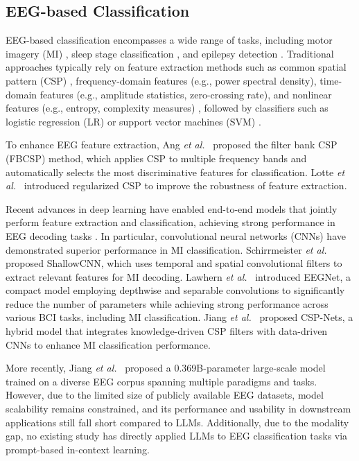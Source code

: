\documentclass[journal,twocolumn]{IEEEtran}
\begin{document}
\subsection{EEG-based Classification}
EEG-based classification encompasses a wide range of tasks, including motor imagery (MI) \cite{decety1996neurophysiological, liu2025spatial}, sleep stage classification \cite{aboalayon2016sleep}, and epilepsy detection \cite{acharya2013automated}. Traditional approaches typically rely on feature extraction methods such as common spatial pattern (CSP) \cite{Ramoser2000}, frequency-domain features (e.g., power spectral density), time-domain features (e.g., amplitude statistics, zero-crossing rate), and nonlinear features (e.g., entropy, complexity measures) \cite{hassan2017automated}, followed by classifiers such as logistic regression (LR) \cite{cox1958regression} or support vector machines (SVM) \cite{cortes1995support}.

To enhance EEG feature extraction, Ang \textit{et al.}~\cite{4634130} proposed the filter bank CSP (FBCSP) method, which applies CSP to multiple frequency bands and automatically selects the most discriminative features for classification. Lotte \textit{et al.}~\cite{lotte2010regularizing} introduced regularized CSP to improve the robustness of feature extraction.

Recent advances in deep learning have enabled end-to-end models that jointly perform feature extraction and classification, achieving strong performance in EEG decoding tasks \cite{craik2019deep, shoeibi2021epileptic}. In particular, convolutional neural networks (CNNs) have demonstrated superior performance in MI classification. Schirrmeister \textit{et al.}~\cite{schirrmeister2017deep} proposed ShallowCNN, which uses temporal and spatial convolutional filters to extract relevant features for MI decoding. Lawhern \textit{et al.}~\cite{EEGNet} introduced EEGNet, a compact model employing depthwise and separable convolutions to significantly reduce the number of parameters while achieving strong performance across various BCI tasks, including MI classification. Jiang \textit{et al.}~\cite{jiang2024csp} proposed CSP-Nets, a hybrid model that integrates knowledge-driven CSP filters with data-driven CNNs to enhance MI classification performance.

More recently, Jiang \textit{et al.}~\cite{jiang2024large} proposed a 0.369B-parameter large-scale model trained on a diverse EEG corpus spanning multiple paradigms and tasks. However, due to the limited size of publicly available EEG datasets, model scalability remains constrained, and its performance and usability in downstream applications still fall short compared to LLMs. Additionally, due to the modality gap, no existing study has directly applied LLMs to EEG classification tasks via prompt-based in-context learning.
\end{document}
